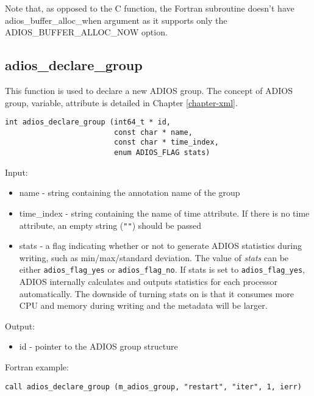 Note that, as opposed to the C function, the Fortran subroutine doesn't have 
adios\_buffer\_alloc\_when argument as it supports only the 
{\small ADIOS\_BUFFER\_ALLOC\_NOW} option.


\subsection{adios\_declare\_group}

This function is used to declare a new ADIOS group. The concept of ADIOS group, variable, 
attribute is detailed in Chapter \ref{chapter-xml}.

\begin{lstlisting}[alsolanguage=C,caption={},label={}]
int adios_declare_group (int64_t * id, 
                         const char * name,
                         const char * time_index,
                         enum ADIOS_FLAG stats)
\end{lstlisting}

Input: 

\begin{itemize}
\item name - string containing the annotation name of the group 

\item time\_index - string containing the name of time attribute. If there is no time 
attribute, an empty string (\verb+""+) should be passed

\item stats - a flag indicating whether or not to generate ADIOS statistics during writing, 
such as min/max/standard deviation. The value of \textit{stats} can be either 
\verb+adios_flag_yes+ or \verb+adios_flag_no+. If stats is set to \verb+adios_flag_yes+, 
ADIOS internally calculates and outputs statistics for each processor automatically. 
The downside of turning stats on is that it consumes more CPU and memory during writing 
and the metadata will be larger. 
\end{itemize}

Output: 
\begin{itemize}
\item id - pointer to the ADIOS group structure
\end{itemize}

Fortran example: 
\begin{lstlisting}[alsolanguage=Fortran,caption={},label={}]
call adios_declare_group (m_adios_group, "restart", "iter", 1, ierr)
\end{lstlisting}


